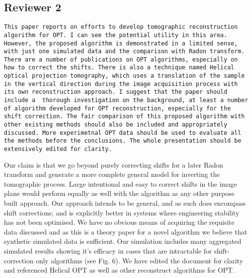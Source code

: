\documentclass[12pt]{report}
\begin{document}
\subsection*{Reviewer 2}
\begin{lstlisting}
This paper reports on efforts to develop tomographic reconstruction algorithm for OPT. I can see the potential utility in this area. However, the proposed algorithm is demonstrated in a limited sense, with just one simulated data and the comparison with Radon transform. There are a number of publications on OPT algorithms, especially on how to correct the shifts. There is also a technique named Helical optical projection tomography, which uses a translation of the sample in the vertical direction during the image acquisition process with its own reconstruction approach. I suggest that the paper should include a  thorough investigation on the background, at least a number of algorithm developed for OPT reconstruction, especially for the shift correction. The fair comparison of this proposed algorithm with other existing methods should also be included and appropriately discussed. More experimetnal OPT data should be used to evaluate all the methods before the conclusions. The whole presentation should be extensively edited for clarity.
\end{lstlisting}
Our claim is that we go beyond purely correcting shifts for a later Radon transform and generate a more complete general model for inverting the tomographic process. Large intentional and easy to correct shifts in the image plane would perform equally as well with the algorithm as any other purpose built approach. Our approach intends to be general, and as such does encompass shift corrections; and is explicitly better in systems where engineering stability has not been optimised.
We have no obvious means of acquiring the requisite data discussed and as this is a theory paper for a novel algorithm we believe that synthetic simulated data is sufficient. Our simulation includes many aggregated simulated results showing it's efficacy in cases that are intractable for shift-correction only algorithms (see Fig. 6). We have edited the document for clarity and referenced Helical OPT as well as other reconstruct algorithms for OPT.
\end{document}
